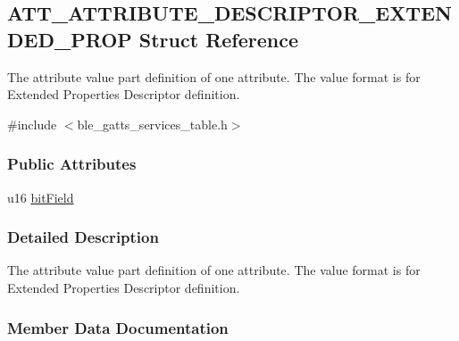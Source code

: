 \hypertarget{struct_a_t_t___a_t_t_r_i_b_u_t_e___d_e_s_c_r_i_p_t_o_r___e_x_t_e_n_d_e_d___p_r_o_p}{}\subsection{A\+T\+T\+\_\+\+A\+T\+T\+R\+I\+B\+U\+T\+E\+\_\+\+D\+E\+S\+C\+R\+I\+P\+T\+O\+R\+\_\+\+E\+X\+T\+E\+N\+D\+E\+D\+\_\+\+P\+R\+OP Struct Reference}
\label{struct_a_t_t___a_t_t_r_i_b_u_t_e___d_e_s_c_r_i_p_t_o_r___e_x_t_e_n_d_e_d___p_r_o_p}


The attribute value part definition of one attribute. The value format is for Extended Properties Descriptor definition.  




{\ttfamily \#include $<$ble\+\_\+gatts\+\_\+services\+\_\+table.\+h$>$}

\subsubsection*{Public Attributes}
\begin{DoxyCompactItemize}
\item 
u16 \hyperlink{struct_a_t_t___a_t_t_r_i_b_u_t_e___d_e_s_c_r_i_p_t_o_r___e_x_t_e_n_d_e_d___p_r_o_p_afafd29fcd62a24cad0ff922b4343e726}{bit\+Field}
\end{DoxyCompactItemize}


\subsubsection{Detailed Description}
The attribute value part definition of one attribute. The value format is for Extended Properties Descriptor definition. 

\subsubsection{Member Data Documentation}
